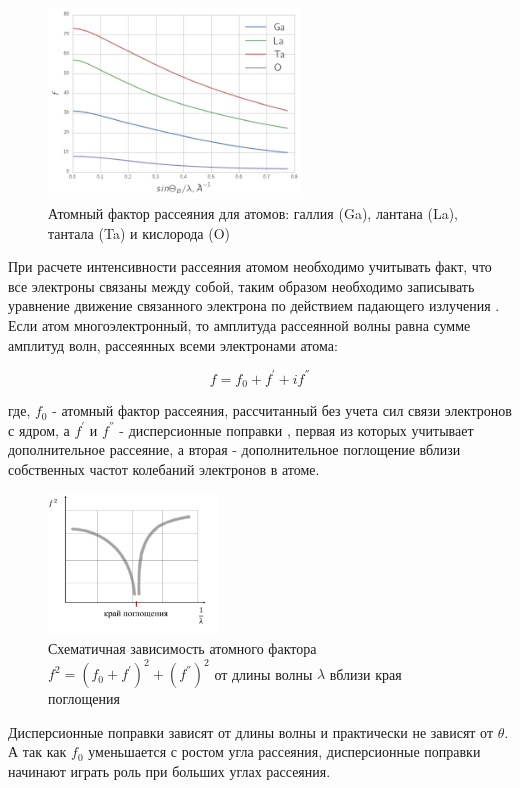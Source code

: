 \begin{figure}[H]
  \centering
  \includegraphics[width=0.6\textwidth]{images/atom_factor_GaLaTa.png}
  \caption{ Атомный фактор рассеяния для атомов: галлия (Ga), лантана (La), тантала (Ta) и  кислорода (O)}
  \label{ris:atom_factor_GaLaTa}
\end{figure}

При расчете интенсивности рассеяния атомом необходимо учитывать факт,
что все электроны связаны между собой, таким образом необходимо записывать
уравнение движение связанного электрона по действием падающего излучения \cite{iveronova1972}.
Если атом многоэлектронный, то амплитуда рассеянной волны равна сумме амплитуд волн,
рассеянных всеми электронами атома:

\begin{equation}
  f = f_0 + f^{'} + i f^{''}
 \end{equation}

 где, $f_0$ - атомный фактор рассеяния, рассчитанный без учета сил связи электронов
 с ядром, а $f^{'}$ и $f^{''}$ - дисперсионные поправки \cite{f0f1f12},
 первая из которых учитывает дополнительное рассеяние,
а вторая - дополнительное поглощение вблизи собственных частот колебаний электронов в атоме.

 \begin{figure}[H]
   \centering
   \includegraphics[width=0.4\textwidth]{images/dispers_f.png}
   \caption{ Схематичная зависимость атомного фактора $f^2 = (f_0 + f^{'})^2 + (f^{''})^2 $ от
   длины волны $\lambda$ вблизи края поглощения}
   \label{ris:dispers_f}
 \end{figure}

Дисперсионные поправки зависят от длины волны и практически не зависят
от $\theta$. А так как $f_0$ уменьшается с ростом угла рассеяния,
 дисперсионные поправки начинают играть роль при больших углах рассеяния.
